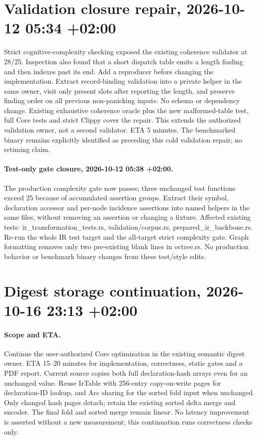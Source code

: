 \documentclass[11pt,a4paper]{article}
\begin{document}
\section*{Validation closure repair, 2026-10-12 05:34 +02:00}
Strict cognitive-complexity checking exposed the existing coherence validator at
28/25. Inspection also found that a short dispatch table emits a length finding
and then indexes past its end. Add a reproducer before changing the implementation.
Extract record-binding validation into a private helper in the same owner, visit
only present slots after reporting the length, and preserve finding order on all
previous non-panicking inputs. No schema or dependency change. Existing exhaustive
coherence oracle plus the new malformed-table test, full Core tests and strict
Clippy cover the repair. This extends the authorized validation owner, not a
second validator. ETA 5 minutes. The benchmarked binary remains explicitly
identified as preceding this cold validation repair; no retiming claim.

\paragraph{Test-only gate closure, 2026-10-12 05:38 +02:00.}
The production complexity gate now passes; three unchanged test functions exceed
25 because of accumulated assertion groups. Extract their symbol, declaration
accessor and per-node incidence assertions into named helpers in the same files,
without removing an assertion or changing a fixture. Affected existing tests:
ir\_transformation\_tests.rs, validation/corpus.rs, prepared\_ir\_backbone.rs.
Re-run the whole IR test target and the all-target strict complexity gate.
Graph formatting removes only two pre-existing blank lines in octree.rs.
No production behavior or benchmark binary changes from these test/style edits.

\section*{Digest storage continuation, 2026-10-16 23:13 +02:00}
\paragraph{Scope and ETA.} Continue the user-authorized Core optimization in the
existing semantic digest owner. ETA 15--20 minutes for implementation, correctness,
static gates and a PDF report. Current source copies both full declaration-hash
arrays even for an unchanged value. Reuse IrTable with 256-entry copy-on-write pages
for declaration-ID lookup, and Arc sharing for the sorted fold input when unchanged.
Only changed hash pages detach; retain the existing sorted delta merge and encoder.
The final fold and sorted merge remain linear. No latency improvement is asserted
without a new measurement; this continuation runs correctness checks only.
\end{document}
